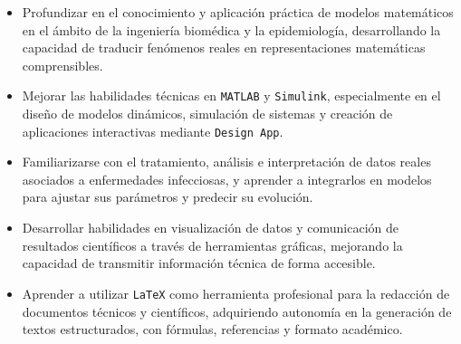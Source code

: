 \begin{itemize}
  \item Profundizar en el conocimiento y aplicación práctica de modelos matemáticos en el ámbito de la ingeniería biomédica y la epidemiología, desarrollando la capacidad de traducir fenómenos reales en representaciones matemáticas comprensibles.
  \item Mejorar las habilidades técnicas en \texttt{MATLAB} y \texttt{Simulink}, especialmente en el diseño de modelos dinámicos, simulación de sistemas y creación de aplicaciones interactivas mediante \texttt{Design App}.
  \item Familiarizarse con el tratamiento, análisis e interpretación de datos reales asociados a enfermedades infecciosas, y aprender a integrarlos en modelos para ajustar sus parámetros y predecir su evolución.
  \item Desarrollar habilidades en visualización de datos y comunicación de resultados científicos a través de herramientas gráficas, mejorando la capacidad de transmitir información técnica de forma accesible.
  \item Aprender a utilizar \texttt{LaTeX} como herramienta profesional para la redacción de documentos técnicos y científicos, adquiriendo autonomía en la generación de textos estructurados, con fórmulas, referencias y formato académico.
\end{itemize}


